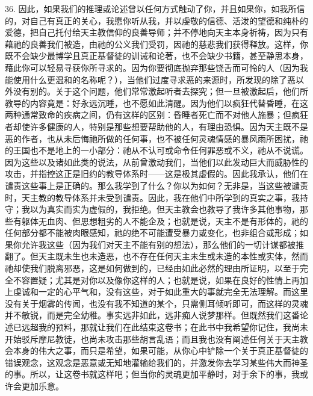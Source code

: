36. 因此，如果我们的推理或论述曾以任何方式触动了你，并且如果你，如我所信的，对自己有真正的关心，我愿你听从我，并以虔敬的信德、活泼的望德和纯朴的爱德，把自己托付给天主教信仰的良善导师；并不停地向天主本身祈祷，因为只有藉祂的良善我们被造，由祂的公义我们受罚，因祂的慈悲我们获得释放。这样，你既不会缺少最博学且真正基督徒的训诫和论著，也不会缺少书籍，甚至静思本身，藉此你可以轻易寻获你所寻求的。因为你要彻底抛弃那些饶舌而可怜的人（因为我能使用什么更温和的名称呢？），当他们过度寻求恶的来源时，所发现的除了恶以外没有别的。关于这个问题，他们常常激起听者去探究；但一旦被激起后，他们所教导的内容竟是：好永远沉睡，也不愿如此清醒。因为他们以疯狂代替昏睡，在这两种通常致命的疾病之间，仍有这样的区别：昏睡者死亡而不对他人施暴；但疯狂者却使许多健康的人，特别是那些想要帮助他的人，有理由恐惧。因为天主既不是恶的作者，也从未后悔祂所做的任何事，也不被任何灵魂情感的暴风雨所困扰，祂的王国也不是地上的一小部分：祂从不认可或命令任何罪恶或不义，祂从不说谎。因为这些以及诸如此类的说法，从前曾激动我们，当他们以此发动巨大而威胁性的攻击，并指控这正是旧约的教导体系时——这是极其虚假的。因此我承认，他们在谴责这些事上是正确的。那么我学到了什么？你以为如何？无非是，当这些被谴责时，天主教的教导体系并未受到谴责。因此，我在他们中所学到的真实之事，我持守；我以为真实而实为虚假的，我拒绝。但天主教会也教导了我许多其他事物，那些有躯体无血肉、但思想粗劣的人不能企及；也就是说，天主不是有形体的，祂的任何部分都不能被肉眼感知，祂的绝不可能遭受暴力或变化，也非组合或形成；如果你允许我这些（因为我们对天主不能有别的想法），那么他们的一切计谋都被推翻了。但天主既未生也未造恶，也不存在任何天主未生或未造的本性或实体，然而祂却使我们脱离邪恶，这是如何做到的，已经由如此必然的理由所证明，以至于完全不容置疑；尤其是对你以及像你这样的人；也就是说，如果在良好的性情上再加上虔诚和一定的心平气和，没有这些，对于如此重大的事就完全无法理解。而这里没有关于烟雾的传闻，也没有我不知道的某个，只需侧耳倾听即可，而这样的灵魂并不敏锐，而是完全幼稚。事实远非如此，远非痴人说梦那样。但既然我们这番论述已远超我的预料，那就让我们在此结束这卷书；在此书中我希望你记住，我尚未开始驳斥摩尼教徒，也尚未攻击那些胡言乱语；而且我也没有阐述任何关于天主教会本身的伟大之事，而只是希望，如果可能，从你心中铲除一个关于真正基督徒的错误观念，这观念是恶意或无知地灌输给我们的，并激发你去学习某些伟大而神圣的事。所以，让这卷书就这样吧；但当你的灵魂更加平静时，对于余下的事，我或许会更加乐意。\par

